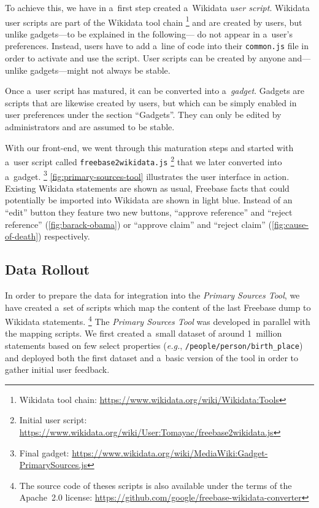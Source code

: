 \documentclass{sig-alternate-2013}
\begin{document}
To achieve this, we have in a~first step created a~Wikidata \emph{user script}.
Wikidata user scripts are part of the Wikidata tool chain%
\footnote{Wikidata tool chain:
\url{https://www.wikidata.org/wiki/Wikidata:Tools}}
and are created by users, but unlike gadgets---to be explained in the following---%
do not appear in a~user's preferences.
Instead, users have to add a~line of code into their \texttt{common.js} file
in order to activate and use the script.
User scripts can be created by anyone and---unlike gadgets---might not always be stable.

Once a~user script has matured, it can be converted into a~\emph{gadget}.
Gadgets are scripts that are likewise created by users,
but which can be simply enabled in user preferences under the section ``Gadgets''.
They can only be edited by administrators and are assumed to be stable.

With our front-end, we went through this maturation steps
and started with a~user script called \texttt{freebase2wikidata.js}%
\footnote{Initial user script:
\url{https://www.wikidata.org/wiki/User:Tomayac/freebase2wikidata.js}}
that we later converted into a~gadget.%
\footnote{Final gadget: \url{https://www.wikidata.org/wiki/MediaWiki:Gadget-PrimarySources.js}}
\autoref{fig:primary-sources-tool} illustrates the user interface in action.
Existing Wikidata statements are shown as usual,
Freebase facts that could potentially be imported into Wikidata are shown in light blue.
Instead of an ``edit'' button they feature two new buttons,
``approve reference'' and ``reject reference''
(\autoref{fig:barack-obama}) or ``approve claim'' and ``reject claim''
(\autoref{fig:cause-of-death}) respectively.

\subsection{Data Rollout}

In order to prepare the data for integration into the \emph{Primary Sources Tool},
we have created a~set of scripts which map the content
of the last Freebase dump to Wikidata statements.%
\footnote{The source code of theses scripts is also available under the terms of the Apache~2.0 license:
\url{https://github.com/google/freebase-wikidata-converter}}
The \emph{Primary Sources Tool} was developed in parallel with the mapping scripts.
We first created a~small dataset of around 1~million statements
based on few select properties (\emph{e.g.}, \texttt{/people/person/birth\_place})
and deployed both the first dataset and a~basic version of the tool
in order to gather initial user feedback.
\end{document}
